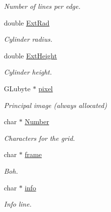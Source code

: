 \begin{DoxyCompactItemize}
\begin{DoxyCompactList}\small\item\em Number of lines per edge. \end{DoxyCompactList}\item 
double \hyperlink{classDraw_adc5d60532f408b3328a02355c35f99d7}{Ext\+Rad}\hypertarget{classDraw_adc5d60532f408b3328a02355c35f99d7}{}\label{classDraw_adc5d60532f408b3328a02355c35f99d7}

\begin{DoxyCompactList}\small\item\em Cylinder radius. \end{DoxyCompactList}\item 
double \hyperlink{classDraw_ae61302982a6baa4f5d27af2a2288ef5a}{Ext\+Height}\hypertarget{classDraw_ae61302982a6baa4f5d27af2a2288ef5a}{}\label{classDraw_ae61302982a6baa4f5d27af2a2288ef5a}

\begin{DoxyCompactList}\small\item\em Cylinder height. \end{DoxyCompactList}\item 
G\+Lubyte $\ast$ \hyperlink{classDraw_a4fb2b9ce0df5949d526526b8710e4bf2}{pixel}\hypertarget{classDraw_a4fb2b9ce0df5949d526526b8710e4bf2}{}\label{classDraw_a4fb2b9ce0df5949d526526b8710e4bf2}

\begin{DoxyCompactList}\small\item\em Principal image (always allocated) \end{DoxyCompactList}\item 
char $\ast$ \hyperlink{classDraw_a4af3f2fea4f5121fb8a95778c80823bf}{Number}\hypertarget{classDraw_a4af3f2fea4f5121fb8a95778c80823bf}{}\label{classDraw_a4af3f2fea4f5121fb8a95778c80823bf}

\begin{DoxyCompactList}\small\item\em Characters for the grid. \end{DoxyCompactList}\item 
char $\ast$ \hyperlink{classDraw_a3084ae24ee3789483bb71ae809decedf}{frame}\hypertarget{classDraw_a3084ae24ee3789483bb71ae809decedf}{}\label{classDraw_a3084ae24ee3789483bb71ae809decedf}

\begin{DoxyCompactList}\small\item\em Boh. \end{DoxyCompactList}\item 
char $\ast$ \hyperlink{classDraw_a65627378647d3a125ae55432f3f569e2}{info}\hypertarget{classDraw_a65627378647d3a125ae55432f3f569e2}{}\label{classDraw_a65627378647d3a125ae55432f3f569e2}

\begin{DoxyCompactList}\small\item\em Info line. \end{DoxyCompactList}\end{DoxyCompactItemize}


